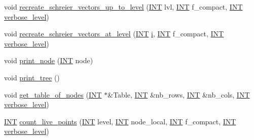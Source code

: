 \begin{DoxyCompactItemize}
\item 
void \mbox{\hyperlink{classgenerator_a2ca7599e91bb012d41153aec95f081f7}{recreate\+\_\+schreier\+\_\+vectors\+\_\+up\+\_\+to\+\_\+level}} (\mbox{\hyperlink{galois_8h_a09fddde158a3a20bd2dcadb609de11dc}{I\+NT}} lvl, \mbox{\hyperlink{galois_8h_a09fddde158a3a20bd2dcadb609de11dc}{I\+NT}} f\+\_\+compact, \mbox{\hyperlink{galois_8h_a09fddde158a3a20bd2dcadb609de11dc}{I\+NT}} \mbox{\hyperlink{classgenerator_a7fedc6488314cbc00dbfcc42d311e1ce}{verbose\+\_\+level}})
\item 
void \mbox{\hyperlink{classgenerator_a7d190e196e7c9721c4135f40f01d922f}{recreate\+\_\+schreier\+\_\+vectors\+\_\+at\+\_\+level}} (\mbox{\hyperlink{galois_8h_a09fddde158a3a20bd2dcadb609de11dc}{I\+NT}} \mbox{\hyperlink{alphabet2_8_c_acb559820d9ca11295b4500f179ef6392}{i}}, \mbox{\hyperlink{galois_8h_a09fddde158a3a20bd2dcadb609de11dc}{I\+NT}} f\+\_\+compact, \mbox{\hyperlink{galois_8h_a09fddde158a3a20bd2dcadb609de11dc}{I\+NT}} \mbox{\hyperlink{classgenerator_a7fedc6488314cbc00dbfcc42d311e1ce}{verbose\+\_\+level}})
\item 
void \mbox{\hyperlink{classgenerator_a1e3711f29fa53013750b2009e549ba49}{print\+\_\+node}} (\mbox{\hyperlink{galois_8h_a09fddde158a3a20bd2dcadb609de11dc}{I\+NT}} node)
\item 
void \mbox{\hyperlink{classgenerator_a4d50a3584d53209baf2bf7d7b9ba31f8}{print\+\_\+tree}} ()
\item 
void \mbox{\hyperlink{classgenerator_a0ef678b519ec26a75a77c446dbf21220}{get\+\_\+table\+\_\+of\+\_\+nodes}} (\mbox{\hyperlink{galois_8h_a09fddde158a3a20bd2dcadb609de11dc}{I\+NT}} $\ast$\&Table, \mbox{\hyperlink{galois_8h_a09fddde158a3a20bd2dcadb609de11dc}{I\+NT}} \&nb\+\_\+rows, \mbox{\hyperlink{galois_8h_a09fddde158a3a20bd2dcadb609de11dc}{I\+NT}} \&nb\+\_\+cols, \mbox{\hyperlink{galois_8h_a09fddde158a3a20bd2dcadb609de11dc}{I\+NT}} \mbox{\hyperlink{classgenerator_a7fedc6488314cbc00dbfcc42d311e1ce}{verbose\+\_\+level}})
\item 
\mbox{\hyperlink{galois_8h_a09fddde158a3a20bd2dcadb609de11dc}{I\+NT}} \mbox{\hyperlink{classgenerator_a69c137b9ff2a32106eaaee315dee28ce}{count\+\_\+live\+\_\+points}} (\mbox{\hyperlink{galois_8h_a09fddde158a3a20bd2dcadb609de11dc}{I\+NT}} level, \mbox{\hyperlink{galois_8h_a09fddde158a3a20bd2dcadb609de11dc}{I\+NT}} node\+\_\+local, \mbox{\hyperlink{galois_8h_a09fddde158a3a20bd2dcadb609de11dc}{I\+NT}} f\+\_\+compact, \mbox{\hyperlink{galois_8h_a09fddde158a3a20bd2dcadb609de11dc}{I\+NT}} \mbox{\hyperlink{classgenerator_a7fedc6488314cbc00dbfcc42d311e1ce}{verbose\+\_\+level}})

\end{DoxyCompactItemize}
